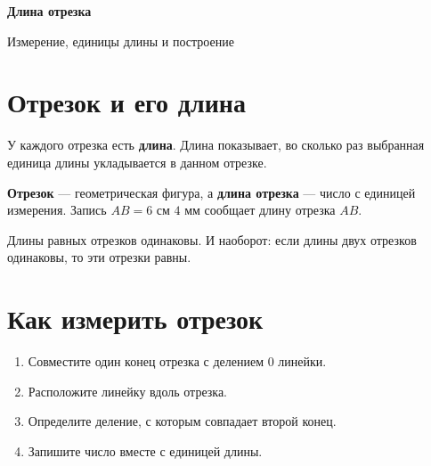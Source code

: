 
\begin{center}
  {\fontsize{25}{30}\selectfont\bfseries\sffamily\color{Primary}
    Длина отрезка}

  \vspace{0.3em}

  {\large\sffamily\color{GrayText}
    Измерение, единицы длины и построение}
\end{center}

\vspace{0.45em}

\section{Отрезок и его длина}

\begin{propertybox}
  У каждого отрезка есть \textbf{длина}. Длина показывает, во сколько раз
  выбранная единица длины укладывается в данном отрезке.
\end{propertybox}

\segmentlengthfigure

\begin{warningbox}[Не путайте]
  \textbf{Отрезок} — геометрическая фигура, а \textbf{длина отрезка} — число
  с единицей измерения. Запись \(AB=6\text{ см }4\text{ мм}\) сообщает длину
  отрезка \(AB\).
\end{warningbox}

Длины равных отрезков одинаковы. И наоборот: если длины двух отрезков
одинаковы, то эти отрезки равны.

\section{Как измерить отрезок}

\begin{propertybox}[Алгоритм]
  \begin{enumerate}
    \item Совместите один конец отрезка с делением \(0\) линейки.
    \item Расположите линейку вдоль отрезка.
    \item Определите деление, с которым совпадает второй конец.
    \item Запишите число вместе с единицей длины.
  \end{enumerate}
\end{propertybox}


